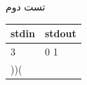 تست دوم
\begin{latin}
	\begin{tabularx}{\textwidth}{|X | X|}
		\hline
		\textbf{stdin} &
		\textbf{stdout}\\
		\hline
		3 & 0 1\\
		))( & \\
		\hline
		
	\end{tabularx}
\end{latin}










